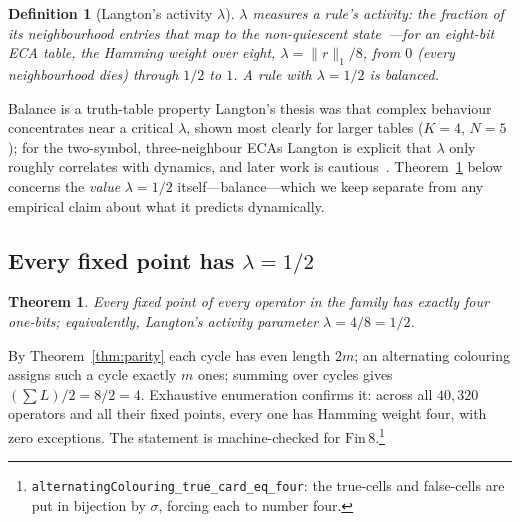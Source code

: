 \documentclass[man,12pt,floatsintext,donotrepeattitle]{apa7}
\newcommand{\sig}{\sigma}
\newtheorem{theorem}{Theorem}
\newtheorem{definition}{Definition}
\begin{document}
\begin{definition}[Langton's activity $\lambda$]\label{def:lambda}
$\lambda$ measures a rule's \emph{activity}: the fraction of its neighbourhood
entries that map to the non-quiescent
state~\parencite{langton1990computation}---for an eight-bit ECA table, the
Hamming weight over eight, $\lambda = \lVert r \rVert_1 / 8$, from $0$ (every
neighbourhood dies) through $1/2$ to $1$. A rule with $\lambda = 1/2$ is
\emph{balanced}.
\end{definition}

\begin{observation}[label={obs:lambda}]{Balance is a truth-table property}
Langton's thesis was that complex behaviour concentrates near a critical
$\lambda$, shown most clearly for larger tables ($K=4$, $N=5$); for the
two-symbol, three-neighbour ECAs Langton is explicit that $\lambda$ only roughly
correlates with dynamics, and later work is
cautious~\parencite{mitchell1993revisiting}. Theorem~\ref{thm:lambda} below
concerns the \emph{value} $\lambda = 1/2$ itself---balance---which we keep
separate from any empirical claim about what it predicts dynamically.
\end{observation}

\subsection{Every fixed point has \texorpdfstring{$\lambda = 1/2$}{lambda = 1/2}}

\begin{theorem}\label{thm:lambda}
Every fixed point of every operator in the family has exactly four one-bits;
equivalently, Langton's activity parameter $\lambda = 4/8 = 1/2$.
\end{theorem}

\noindent By Theorem~\ref{thm:parity} each cycle has even length $2m$; an
alternating colouring assigns such a cycle exactly $m$ ones; summing over
cycles gives $(\sum L)/2 = 8/2 = 4$. Exhaustive enumeration confirms it:
across all $40{,}320$ operators and all their fixed points, every one has
Hamming weight four, with zero exceptions. The statement is machine-checked
for $\mathrm{Fin}\,8$.\footnote{%
\texttt{alternatingColouring\_true\_card\_eq\_four}: the true-cells and
false-cells are put in bijection by $\sig$, forcing each to number four.}
\end{document}
